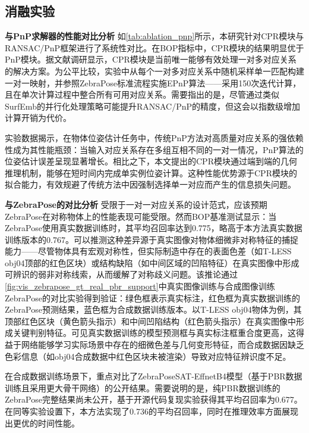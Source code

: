 

\subsection{消融实验}

\textbf{与PnP求解器的性能对比分析 } 如\autoref{tab:ablation_pnp}所示，本研究针对CPR模块与RANSAC/PnP框架进行了系统性对比。在BOP指标中，CPR模块的结果明显优于PnP模块。据文献调研显示，CPR模块是当前唯一能够有效处理一对多对应关系的解决方案。为公平比较，实验中从每个一对多对应关系中随机采样单一匹配构建一对一映射，并参照ZebraPose标准流程实施EPnP算法\cite{EPnP}——采用150次迭代计算，且在单次计算过程中整合所有可用对应关系。需要指出的是，尽管通过类似SurfEmb的并行化处理策略可能提升RANSAC/PnP的精度，但这会以指数级增加计算开销为代价。

\par 实验数据揭示，在物体位姿估计任务中，传统PnP方法对高质量对应关系的强依赖性成为其性能瓶颈：当输入对应关系存在多组互相不同的一对一情况，PnP算法的位姿估计误差呈现显著增长。相比之下，本文提出的CPR模块通过端到端的几何推理机制，能够在短时间内完成单实例位姿计算。这种性能优势源于CPR模块的拟合能力，有效规避了传统方法中因强制选择单一对应而产生的信息损失问题。



\textbf{与ZebraPose的对比分析 } 受限于一对一对应关系的设计范式，应该预期ZebraPose在对称物体上的性能表现可能受限。然而BOP基准测试显示：当ZebraPose使用真实数据训练时，其平均召回率达到0.775，略高于本方法真实数据训练版本的0.767。可以推测这种差异源于真实图像对物体细微非对称特征的捕捉能力——尽管物体具有宏观对称性，但实际制造中存在的表面色差（如T-LESS obj04顶部的红色区块）或结构缺陷（如中间区域的凹陷特征）在真实图像中形成可辨识的弱非对称线索，从而缓解了对称歧义问题。该推论通过\autoref{fig:vis_zebrapose_gt_real_pbr_support}中真实图像训练与合成图像训练ZebraPose的对比实验得到验证：绿色框表示真实标注，红色框为真实数据训练的ZebraPose预测结果，蓝色框为合成数据训练版本。以T-LESS obj04物体为例，其顶部红色区块（黄色箭头指示）和中间凹陷结构（红色箭头指示）在真实图像中形成关键判别特征。可见真实数据训练的模型预测框与真实标注框重合度更高，这得益于网络能够学习实际场景中存在的细微色差与几何变形特征，而合成数据因缺乏色彩信息（如obj04合成数据中红色区块未被渲染）导致对应特征辨识度不足。

\par 在合成数据训练场景下，重点对比了ZebraPoseSAT-EffnetB4模型（基于PBR数据训练且采用更大骨干网络）的公开结果。需要说明的是，纯PBR数据训练的ZebraPose完整结果尚未公开，基于开源代码复现实验获得其平均召回率为0.677。在同等实验设置下，本方法实现了0.736的平均召回率，同时在推理效率方面展现出更优的时间性能。

